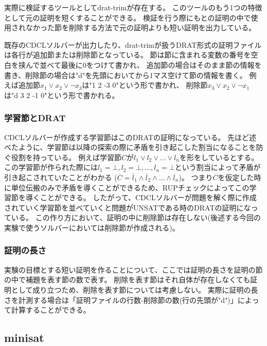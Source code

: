 \documentclass[titlepage]{jsarticle}
\begin{document}
実際に検証するツールとしてdrat-trimが存在する。
このツールのもう1つの特徴として元の証明を短くすることができる。
検証を行う際にもとの証明の中で使用されなかった節を削除する方法で元の証明よりも短い証明を出力している。

既存のCDCLソルバーが出力したり、drat-trimが扱うDRAT形式の証明ファイルは各行が追加節または削除節となっている。
節は節に含まれる変数の番号を空白を挟んで並べて最後に0をつけて書かれ、
追加節の場合はそのまま節の情報を書き、削除節の場合は"d"を先頭においてから1マス空けて節の情報を書く。
例えば追加節$x_1 \lor x_2 \lor \neg x_3$は"1 2 -3 0"という形で書かれ、
削除節$x_3 \lor x_2 \lor \neg x_1$は"d 3 2 -1 0"という形で書かれる。




\subsubsection{学習節とDRAT}
CDCLソルバーが作成する学習節はこのDRATの証明になっている。
先ほど述べたように、学習節は以降の探索の際に矛盾を引き起こした割当になることを防ぐ役割を持っている。
例えば学習節$C$が$l_1 \lor l_2 \lor ... \lor l_n$を形をしているとする。
この学習節が作られた際には$l_1=\bot, l_2=\bot, ... , l_n=\bot$という割当によって矛盾が引き起こされていたことがわかる
($\overline C = \overline l_1 \land \overline l_2 \land ... \land \overline l_n$)。
つまり$\overline C$を仮定した時に単位伝搬のみで矛盾を導くことができるため、RUPチェックによってこの学習節を導くことができる。
したがって、CDCLソルバーが問題を解く際に作成されていく学習節を並べていくと問題がUNSATである時のDRATの証明になっている。
この作り方において、証明の中に削除節は存在しない(後述する今回の実験で使うソルバーにおいては削除節が作成される)。



\subsubsection{証明の長さ}
実験の目標とする短い証明を作ることについて、ここでは証明の長さを証明の節の中で補題を表す節の数で表す。
削除を表す節はそれ自体が存在しなくても証明として成り立つため、削除を表す節については考慮しない。
実際に証明の長さを計測する場合は「証明ファイルの行数-削除節の数(行の先頭が"d")」によって計算することができる。





\subsection{minisat}
\end{document}
